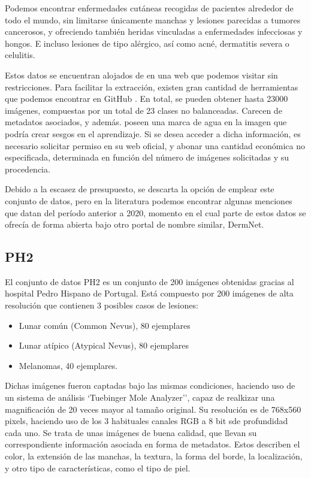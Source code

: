 Podemos encontrar enfermedades cutáneas recogidas de pacientes alrededor de todo el mundo, sin limitarse únicamente manchas  y lesiones parecidas a tumores cancerosos, y ofreciendo también heridas vinculadas a enfermedades infecciosas y hongos.  E incluso lesiones de tipo alérgico, así como acné, dermatitis severa o celulitis.

Estos datos se encuentran alojados de en una web que podemos visitar sin restricciones. Para facilitar la extracción,  existen gran cantidad de herramientas que podemos encontrar en GitHub \cite{githubdermnet}. En total, se pueden obtener hasta 23000 imágenes, compuestas por un total de 23 clases no balanceadas. Carecen de metadatos asociados, y además. poseen una marca de agua en la imagen que podría crear sesgos en el aprendizaje. Si se desea acceder a dicha información, es necesario solicitar permiso en su web oficial, y abonar una cantidad económica no especificada, determinada en función del  número de imágenes solicitadas y su procedencia.

Debido a la escasez de presupuesto, se descarta la opción de emplear este conjunto de datos, pero en la literatura podemos encontrar algunas menciones que datan del período anterior a 2020, momento en el cual parte de estos datos se ofrecía de forma abierta bajo otro portal de nombre similar, DermNet.


\subsection{ PH2}
El conjunto de datos PH2 \cite{ph2} es un conjunto de 200 imágenes obtenidas gracias al hospital Pedro Hispano de Portugal. Está compuesto por 200 imágenes de alta resolución que contienen 3 posibles casos de lesiones:
\begin{itemize}
	\item Lunar común (Common Nevus), 80 ejemplares
	\item Lunar atípico (Atypical Nevus), 80 ejemplares
	\item Melanomas, 40 ejemplares.
\end{itemize}

Dichas imágenes fueron captadas bajo las mismas condiciones, haciendo uso de un  sistema de análisis `Tuebinger Mole Analyzer'', capaz de realkizar una magnificación de 20 veces mayor al tamaño original. Su resolución es de  768x560 pixels, haciendo uso de los 3 habituales canales RGB a 8 bit sde profundidad cada uno. Se trata de unas imágenes de buena calidad, que llevan su correspondiente información asociada en forma de metadatos. Estos describen el color, la extensión de las manchas, la textura, la forma del borde, la localización, y otro tipo de características, como el tipo de piel.

